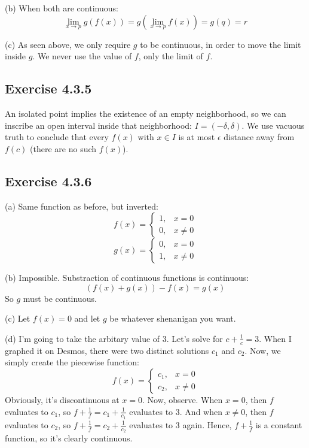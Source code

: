 \documentclass{book}
\begin{document}
\noindent
(b)
When both are continuous:
$$\lim_{x \rightarrow p} g(f(x)) = g(\lim_{x \rightarrow p} f(x)) = g(q) = r$$

\noindent
(c)
As seen above, we only require $g$ to be continuous, in order to move the limit inside $g$. We never use the value of $f$, only the limit of $f$.

\subsection*{Exercise 4.3.5}
An isolated point implies the existence of an empty neighborhood, so we can inscribe an open interval inside that neighborhood: $I = (-\delta, \delta)$. We use vacuous truth to conclude that every $f(x)$ with $x \in I$ is at most $\epsilon$ distance away from $f(c)$ (there are no such $f(x)$).

\subsection*{Exercise 4.3.6}
(a)
Same function as before, but inverted:
$$f(x) = \begin{cases}
    1, & x = 0 \\
    0, & x \neq 0
\end{cases}$$
$$g(x) = \begin{cases}
    0, & x = 0 \\
    1, & x \neq 0
\end{cases}$$

\noindent
(b)
Impossible. Substraction of continuous functions is continuous:
$$(f(x) + g(x)) - f(x) = g(x)$$
So $g$ must be continuous.

\noindent
(c)
Let $f(x) = 0$ and let $g$ be whatever shenanigan you want.

\noindent
(d)
I'm going to take the arbitary value of 3. Let's solve for $c + \frac{1}{c} = 3$. When I graphed it on Desmos, there were two distinct solutions $c_1$ and $c_2$. Now, we simply create the piecewise function:
$$f(x) = \begin{cases}
    c_1, & x = 0 \\
    c_2, & x \neq 0
\end{cases}$$
Obviously, it's discontinuous at $x = 0$. Now, observe. When $x = 0$, then $f$ evaluates to $c_1$, so $f + \frac{1}{f} = c_1 + \frac{1}{c_1}$ evaluates to $3$. And when $x \neq 0$, then $f$ evaluates to $c_2$, so $f + \frac{1}{f} = c_2 + \frac{1}{c_2}$ evaluates to $3$ again. Hence, $f + \frac{1}{f}$ is a constant function, so it's clearly continuous.
\end{document}
